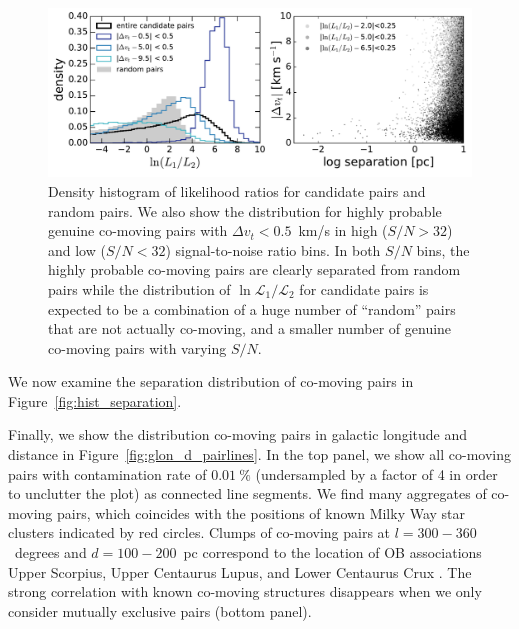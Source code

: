 \documentclass[manuscript, letterpaper]{aastex6}
\begin{document}
\begin{figure}[p]
  \begin{center}
    \includegraphics[width=\textwidth]{figures/likelihoodratios.pdf}
  \end{center}
  \caption{%
    Density histogram of likelihood ratios for candidate pairs and random pairs.
    We also show the distribution for highly probable genuine co-moving pairs with
    $\Delta v_t < 0.5$~km/s in high ($S/N>32$) and low ($S/N<32$) signal-to-noise ratio
    bins. In both $S/N$ bins, the highly probable co-moving pairs are clearly
    separated from random pairs while the distribution of $\ln \mathcal{L}_1 /\mathcal{L}_2$
    for candidate pairs is expected to be a combination of
    a huge number of ``random'' pairs that are not actually co-moving, and
    a smaller number of genuine co-moving pairs with varying $S/N$.
    \label{fig:likelihoodratios}}
\end{figure}

We now examine the separation distribution of co-moving pairs in
Figure~\ref{fig:hist_separation}.

Finally, we show the distribution co-moving pairs in galactic longitude and
distance in Figure~\ref{fig:glon_d_pairlines}.
In the top panel, we show all co-moving pairs with contamination rate of $0.01~\%$
(undersampled by a factor of 4 in order to unclutter the plot) as connected line segments.
We find many aggregates of co-moving pairs, which coincides with the positions of
known Milky Way star clusters \citep{Kharchenko:2016aa} indicated by red circles.
Clumps of co-moving pairs at $l=300-360$~degrees and $d=100-200$~pc correspond
to the location of OB associations
Upper Scorpius, Upper Centaurus Lupus, and Lower Centaurus Crux
\citep{de-Zeeuw:1999aa}.
The strong correlation with known co-moving structures disappears when we only
consider mutually exclusive pairs (bottom panel).
\end{document}
